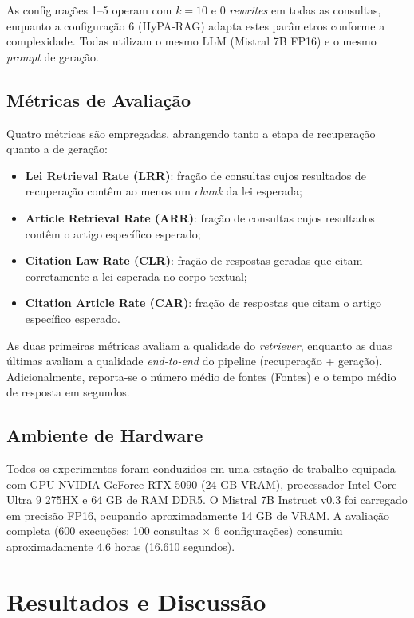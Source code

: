 \documentclass[12pt]{article}
\begin{document}
As configurações 1--5 operam com $k = 10$ e 0 \textit{rewrites} em todas as consultas, enquanto a configuração 6 (HyPA-RAG) adapta estes parâmetros conforme a complexidade. Todas utilizam o mesmo LLM (Mistral 7B FP16) e o mesmo \textit{prompt} de geração.

\subsection{Métricas de Avaliação}

Quatro métricas são empregadas, abrangendo tanto a etapa de recuperação quanto a de geração:

\begin{itemize}
\item \textbf{Lei Retrieval Rate (LRR)}: fração de consultas cujos resultados de recuperação contêm ao menos um \textit{chunk} da lei esperada;
\item \textbf{Article Retrieval Rate (ARR)}: fração de consultas cujos resultados contêm o artigo específico esperado;
\item \textbf{Citation Law Rate (CLR)}: fração de respostas geradas que citam corretamente a lei esperada no corpo textual;
\item \textbf{Citation Article Rate (CAR)}: fração de respostas que citam o artigo específico esperado.
\end{itemize}

As duas primeiras métricas avaliam a qualidade do \textit{retriever}, enquanto as duas últimas avaliam a qualidade \textit{end-to-end} do pipeline (recuperação + geração). Adicionalmente, reporta-se o número médio de fontes (Fontes) e o tempo médio de resposta em segundos.

\subsection{Ambiente de Hardware}

Todos os experimentos foram conduzidos em uma estação de trabalho equipada com GPU NVIDIA GeForce RTX 5090 (24 GB VRAM), processador Intel Core Ultra 9 275HX e 64 GB de RAM DDR5. O Mistral 7B Instruct v0.3 foi carregado em precisão FP16, ocupando aproximadamente 14 GB de VRAM. A avaliação completa (600 execuções: 100 consultas $\times$ 6 configurações) consumiu aproximadamente 4,6 horas (16.610 segundos).

\section{Resultados e Discussão}
\end{document}
